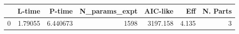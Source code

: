 \begin{tabular}{lrrrrrr}
\toprule
{} &   L-time &    P-time &  N\_params\_expt &  AIC-like &    Eff &  N. Parts \\
\midrule
0 &  1.79055 &  6.440673 &           1598 &  3197.158 &  4.135 &         3 \\
\bottomrule
\end{tabular}
